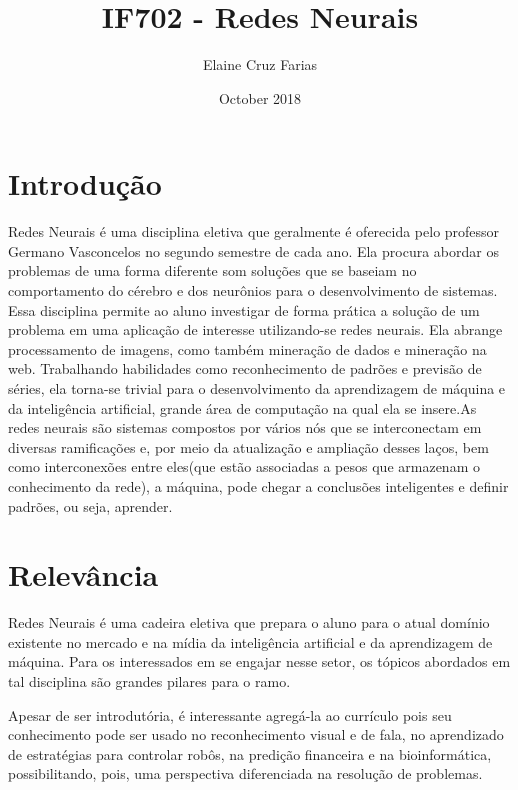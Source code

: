 \documentclass[a4paper]{article}
\title{IF702 - Redes Neurais}
\author{Elaine Cruz Farias}
\date{October 2018}
\begin{document}
\maketitle

\section{Introdução}
Redes Neurais é uma disciplina eletiva que geralmente é oferecida pelo professor Germano Vasconcelos no segundo semestre de cada ano. Ela procura abordar os problemas de uma forma diferente som soluções que se baseiam no comportamento do cérebro e dos neurônios para o desenvolvimento de sistemas. Essa disciplina permite ao aluno investigar de forma prática a solução de um problema em uma aplicação de interesse utilizando-se redes neurais. Ela abrange processamento de imagens, como também mineração de dados e mineração na web. Trabalhando habilidades como reconhecimento de padrões e previsão de séries, ela torna-se trivial para o desenvolvimento da aprendizagem de máquina e da inteligência artificial, grande área de computação na qual ela se insere.As redes neurais são sistemas compostos por vários nós que se interconectam em diversas ramificações e, por meio da atualização e ampliação desses laços, bem como interconexões entre eles(que estão associadas a pesos que armazenam o conhecimento da rede), a máquina, pode chegar a conclusões inteligentes e definir padrões, ou seja, aprender.



\section{Relevância}
Redes Neurais é uma cadeira eletiva que prepara o aluno para o atual domínio existente no mercado e na mídia da inteligência artificial e da aprendizagem de máquina. Para os interessados em se engajar nesse setor, os tópicos abordados em tal disciplina são grandes pilares para o ramo.

Apesar de ser introdutória, é interessante agregá-la ao currículo pois seu conhecimento pode ser usado no reconhecimento visual e de fala, no aprendizado de estratégias para controlar robôs, na predição financeira e na bioinformática, possibilitando, pois, uma perspectiva diferenciada na resolução de problemas. 
\end{document}
